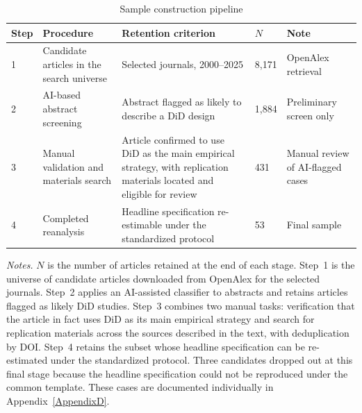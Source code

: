 \documentclass[11pt]{article}
\begin{document}
\begin{table}[!htbp]
\centering
\caption{Sample construction pipeline}
\label{tab:sample_pipeline}
\begin{threeparttable}
\small
\begin{tabular}{p{.6cm} p{4cm} p{4.5cm} p{1cm} p{2.6cm}}
\toprule
\textbf{Step} & \textbf{Procedure} & \textbf{Retention criterion} & \textbf{$N$} & \textbf{Note} \\
\midrule
1 & Candidate articles in the search universe & Selected journals, 2000--2025 & 8,171 & OpenAlex retrieval \\
\midrule
2 & AI-based abstract screening & Abstract flagged as likely to describe a DiD design & 1,884 & Preliminary screen only \\
\midrule
3 & Manual validation and materials search & Article confirmed to use DiD as the main empirical strategy, with replication materials located and eligible for review & 431 & Manual review of AI-flagged cases \\
\midrule
4 & Completed reanalysis & Headline specification re-estimable under the standardized protocol & 53 & Final sample \\
\bottomrule
\end{tabular}
\begin{tablenotes}[flushleft]
\footnotesize
\item \textit{Notes.} $N$ is the number of articles retained at the end of each stage. Step~1 is the universe of candidate articles downloaded from OpenAlex for the selected journals. Step~2 applies an AI-assisted classifier to abstracts and retains articles flagged as likely DiD studies. Step~3 combines two manual tasks: verification that the article in fact uses DiD as its main empirical strategy and search for replication materials across the sources described in the text, with deduplication by DOI. Step~4 retains the subset whose headline specification can be re-estimated under the standardized protocol. Three candidates dropped out at this final stage because the headline specification could not be reproduced under the common template. These cases are documented individually in Appendix~\ref{AppendixD}.
\end{tablenotes}
\end{threeparttable}
\end{table}
\end{document}
